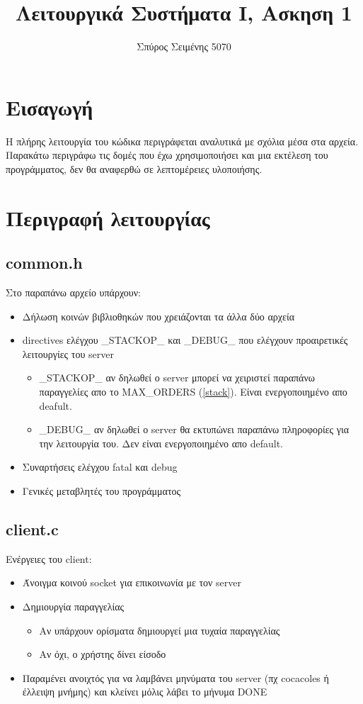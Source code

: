 \documentclass{article}
\title{Λειτουργικά Συστήματα Ι, Ασκηση 1}
\author{Σπύρος Σειμένης 5070}
\begin{document}
\maketitle

\section{Εισαγωγή}
Η πλήρης λειτουργία του κώδικα περιγράφεται αναλυτικά με σχόλια μέσα στα αρχεία. Παρακάτω περιγράφω τις δομές που έχω χρησιμοποιήσει και μια εκτέλεση του προγράμματος, δεν θα αναφερθώ σε λεπτομέρειες υλοποιήσης.

\section{Περιγραφή λειτουργίας}
\subsection{common.h}
Στο παραπάνω αρχείο υπάρχουν:
\begin{itemize}
 \item Δήλωση κοινών βιβλιοθηκών που χρειάζονται τα άλλα δύο αρχεία
 \item directives ελέγχου \_STACKOP\_ και \_DEBUG\_ που ελέγχουν προαιρετικές λειτουργίες του server
 \begin{itemize}
  \item \_STACKOP\_ αν δηλωθεί ο server μπορεί να χειριστεί παραπάνω παραγγελίες απο το MAX\_ORDERS (\ref{stack}). Είναι ενεργοποιημένο απο deafult.
  \item \_DEBUG\_ αν δηλωθεί ο server θα εκτυπώνει παραπάνω πληροφορίες για την λειτουργία του. Δεν είναι ενεργοποιημένο απο default.
 \end{itemize}
 \item Συναρτήσεις ελέγχου fatal και debug
 \item Γενικές μεταβλητές του προγράμματος
\end{itemize}

\subsection{client.c}
Ενέργειες του client:
\begin{itemize}
 \item Άνοιγμα κοινού socket για επικοινωνία με τον server
 \item Δημιουργία παραγγελίας
 \begin{itemize}
 \item Αν υπάρχουν ορίσματα δημιουργεί μια τυχαία παραγγελίας
 \item Αν όχι, ο χρήστης δίνει είσοδο
 \end{itemize}
 \item Παραμένει ανοιχτός για να λαμβάνει μηνύματα του server (πχ cocacoles ή έλλειψη μνήμης) και κλείνει μόλις λάβει το μήνυμα DONE 
\end{itemize}
\pagebreak
\end{document}
